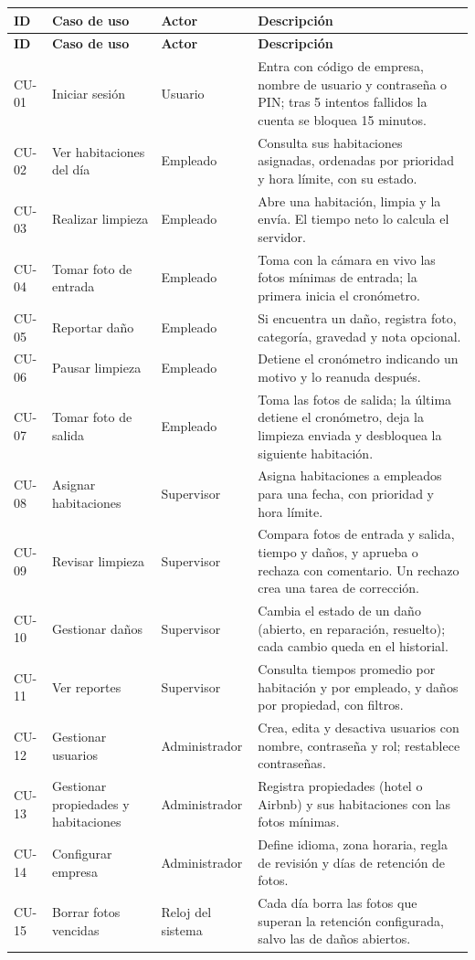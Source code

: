 \documentclass[11pt,a4paper]{article}
\begin{document}
{\small
\setlength{\tabcolsep}{4pt}
\begin{longtable}{L{1.1cm} L{3.4cm} L{2.4cm} L{7.6cm}}
\toprule
\textbf{ID} & \textbf{Caso de uso} & \textbf{Actor} & \textbf{Descripción}\\
\midrule
\endfirsthead
\toprule
\textbf{ID} & \textbf{Caso de uso} & \textbf{Actor} & \textbf{Descripción}\\
\midrule
\endhead
\bottomrule
\endfoot
CU-01 & Iniciar sesión & Usuario & Entra con código de empresa, nombre de usuario y contraseña o PIN; tras 5 intentos fallidos la cuenta se bloquea 15 minutos.\\
CU-02 & Ver habitaciones del día & Empleado & Consulta sus habitaciones asignadas, ordenadas por prioridad y hora límite, con su estado.\\
CU-03 & Realizar limpieza & Empleado & Abre una habitación, limpia y la envía. El tiempo neto lo calcula el servidor.\\
CU-04 & Tomar foto de entrada & Empleado & Toma con la cámara en vivo las fotos mínimas de entrada; la primera inicia el cronómetro.\\
CU-05 & Reportar daño & Empleado & Si encuentra un daño, registra foto, categoría, gravedad y nota opcional.\\
CU-06 & Pausar limpieza & Empleado & Detiene el cronómetro indicando un motivo y lo reanuda después.\\
CU-07 & Tomar foto de salida & Empleado & Toma las fotos de salida; la última detiene el cronómetro, deja la limpieza enviada y desbloquea la siguiente habitación.\\
CU-08 & Asignar habitaciones & Supervisor & Asigna habitaciones a empleados para una fecha, con prioridad y hora límite.\\
CU-09 & Revisar limpieza & Supervisor & Compara fotos de entrada y salida, tiempo y daños, y aprueba o rechaza con comentario. Un rechazo crea una tarea de corrección.\\
CU-10 & Gestionar daños & Supervisor & Cambia el estado de un daño (abierto, en reparación, resuelto); cada cambio queda en el historial.\\
CU-11 & Ver reportes & Supervisor & Consulta tiempos promedio por habitación y por empleado, y daños por propiedad, con filtros.\\
CU-12 & Gestionar usuarios & Administrador & Crea, edita y desactiva usuarios con nombre, contraseña y rol; restablece contraseñas.\\
CU-13 & Gestionar propiedades y habitaciones & Administrador & Registra propiedades (hotel o Airbnb) y sus habitaciones con las fotos mínimas.\\
CU-14 & Configurar empresa & Administrador & Define idioma, zona horaria, regla de revisión y días de retención de fotos.\\
CU-15 & Borrar fotos vencidas & Reloj del sistema & Cada día borra las fotos que superan la retención configurada, salvo las de daños abiertos.\\
\end{longtable}
}
\end{document}
